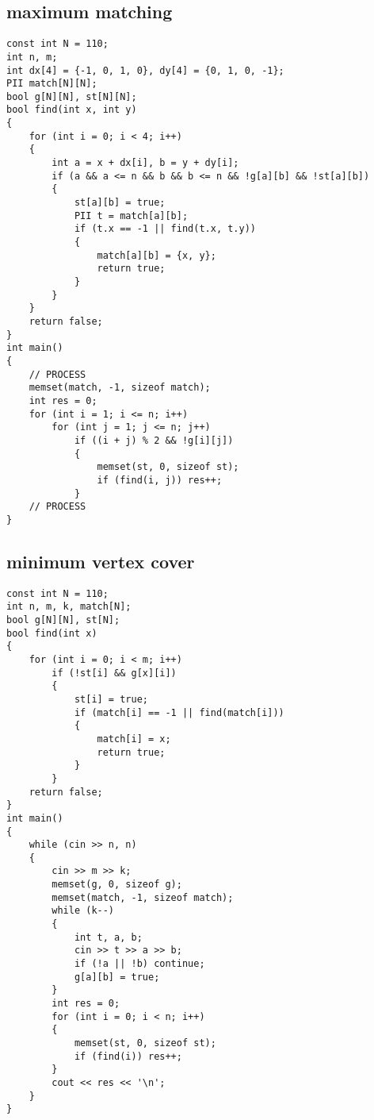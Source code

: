 \subsection{maximum matching}
\begin{lstlisting}
const int N = 110;
int n, m;
int dx[4] = {-1, 0, 1, 0}, dy[4] = {0, 1, 0, -1};
PII match[N][N];
bool g[N][N], st[N][N];
bool find(int x, int y)
{
    for (int i = 0; i < 4; i++)
    {
        int a = x + dx[i], b = y + dy[i];
        if (a && a <= n && b && b <= n && !g[a][b] && !st[a][b])
        {
            st[a][b] = true;
            PII t = match[a][b];
            if (t.x == -1 || find(t.x, t.y))
            {
                match[a][b] = {x, y};
                return true;
            }
        }
    }
    return false;
}
int main()
{
    // PROCESS
    memset(match, -1, sizeof match);
    int res = 0;
    for (int i = 1; i <= n; i++)
        for (int j = 1; j <= n; j++)
            if ((i + j) % 2 && !g[i][j])
            {
                memset(st, 0, sizeof st);
                if (find(i, j)) res++;
            }
    // PROCESS
}
\end{lstlisting}
\subsection{minimum vertex cover}
\begin{lstlisting}
const int N = 110;
int n, m, k, match[N];
bool g[N][N], st[N];
bool find(int x)
{
    for (int i = 0; i < m; i++)
        if (!st[i] && g[x][i])
        {
            st[i] = true;
            if (match[i] == -1 || find(match[i]))
            {
                match[i] = x;
                return true;
            }
        }
    return false;
}
int main()
{
    while (cin >> n, n)
    {
        cin >> m >> k;
        memset(g, 0, sizeof g);
        memset(match, -1, sizeof match);
        while (k--)
        {
            int t, a, b;
            cin >> t >> a >> b;
            if (!a || !b) continue;
            g[a][b] = true;
        }
        int res = 0;
        for (int i = 0; i < n; i++)
        {
            memset(st, 0, sizeof st);
            if (find(i)) res++;
        }
        cout << res << '\n';
    }
}
\end{lstlisting}
